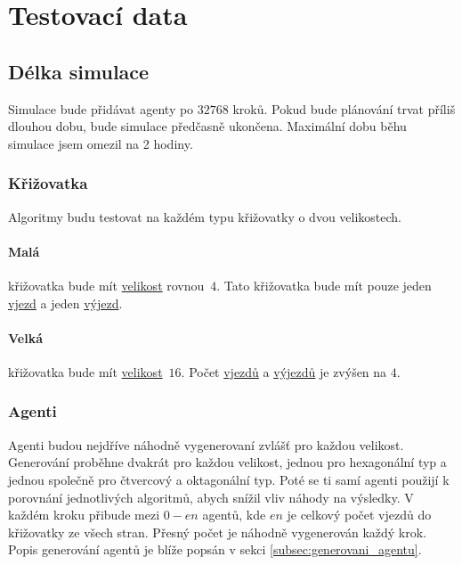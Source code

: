 \section{Testovací data}\label{sec:testovaci_data}


\subsection{Délka simulace}\label{subsec:delka_simulace}

Simulace bude přidávat agenty po $32768$ kroků.
Pokud bude plánování trvat příliš dlouhou dobu, bude simulace předčasně ukončena.
Maximální dobu běhu simulace jsem omezil na 2 hodiny.

\subsubsection{Křižovatka}

Algoritmy budu testovat na každém typu křižovatky o dvou velikostech.
\paragraph{Malá}\label{par:data_mala} křižovatka bude mít \hyperref[par:velikost_krizovatky]{velikost} rovnou~$4$.
Tato křižovatka bude mít pouze jeden \hyperref[par:vjezdy]{vjezd} a jeden \hyperref[par:vyjezdy]{výjezd}.
\paragraph{Velká}\label{par:data_velka} křižovatka bude mít \hyperref[par:velikost_krizovatky]{velikost}~$16$.
Počet \hyperref[par:vjezdy]{vjezdů} a \hyperref[par:vyjezdy]{výjezdů} je zvýšen na $4$.

\subsubsection{Agenti}

Agenti budou nejdříve náhodně vygenerovaní zvlášť pro každou velikost.
Generování proběhne dvakrát pro každou velikost,
jednou pro hexagonální typ a jednou společně pro čtvercový a oktagonální typ.
Poté se ti samí agenti použijí k porovnání jednotlivých algoritmů, abych snížil vliv náhody na výsledky.
V každém kroku přibude mezi $0 - en$ agentů, kde $en$ je celkový počet vjezdů do křižovatky ze všech stran.
Přesný počet je náhodně vygenerován každý krok.
Popis generování agentů je blíže popsán v sekci \ref{subsec:generovani_agentu}.

